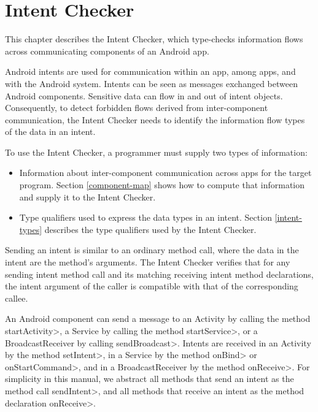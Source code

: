 \htmlhr

\newcommand{\tp}[1]{\mathit{typeof}}
\newcommand{\Fix}[1]{\textbf{[[}{\color{red} #1}\textbf{]]}}
\newcommand{\theIntentChecker}{the Intent Checker\xspace}
\newcommand{\TheIntentChecker}{The Intent Checker\xspace}
\newcommand{\sendIntent}{\<sendIntent>}
\newcommand{\onReceive}{\<onReceive>}


\chapter{Intent Checker\label{intent-checker}}

This chapter describes \theIntentChecker{},
which type-checks information flows across communicating components of an
Android app.

Android intents are used for
communication within an app, among apps, and with the Android system.
Intents can be seen as messages exchanged between Android components. Sensitive
data can flow in and out of intent objects. Consequently, to detect forbidden
flows derived from inter-component communication, \theIntentChecker{} needs to
identify the information flow types of the data in an intent.

To use \theIntentChecker{}, a programmer must supply two types of information:
\begin{itemize}
\item
Information about inter-component communication across apps for the target
program. Section \ref{component-map} shows how to compute that
information and supply it to the Intent Checker.
\item
Type qualifiers used to express the data types in an intent. Section
\ref{intent-types} describes the type qualifiers used by \theIntentChecker.
\end{itemize}

Sending an intent is similar to an ordinary method call,
where the data in the intent are the method's arguments. 
\TheIntentChecker{} verifies that for any sending intent method
call and its matching receiving intent method declarations,
the intent argument of the caller is compatible with that of the corresponding
callee. 

An Android component can send a message to an Activity by calling the method \<startActivity>, a
Service by calling the method \<startService>, or a BroadcastReceiver by
calling \<sendBroadcast>. Intents are received in an Activity by the method
\<setIntent>, in a Service by the method \<onBind> or
\<onStartCommand>, and in a BroadcastReceiver by the method
\<onReceive>. For simplicity in this manual, we abstract all methods
that send an intent as the method call \sendIntent{}, and all methods that
receive an intent as the method declaration \onReceive{}.

